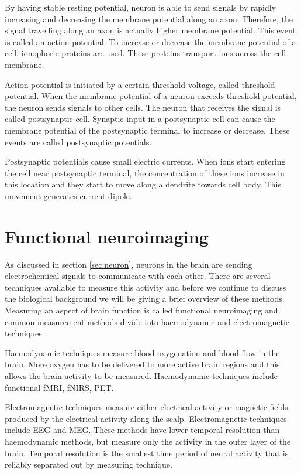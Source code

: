 By having stable resting potential, neuron is able to send signals by rapidly increasing and decreasing the membrane potential along an axon. Therefore, the signal travelling along an axon is actually higher membrane potential. This event is called an action potential. To increase or decrease the membrane potential of a cell, ionophoric proteins are used. These proteins transport ions across the cell membrane.

Action potential is initiated by a certain threshold voltage, called threshold potential. When the membrane potential of a neuron exceeds threshold potential, the neuron sends signals to other cells. The neuron that receives the signal is called postsynaptic cell. Synaptic input in a postsynaptic cell can cause the membrane potential of the postsynaptic terminal to increase or decrease. These events are called postsynaptic potentials.

Postsynaptic potentials cause small electric currents. When ions start entering the cell near postsynaptic terminal, the concentration of these ions increase in this location and they start to move along a dendrite towards cell body. This movement generates current dipole.

\section{Functional neuroimaging}
\label{sec:neuroimaging}

As discussed in section \ref{sec:neuron}, neurons in the brain are sending electrochemical signals to communicate with each other. There are several techniques available to measure this activity and before we continue to discuss the biological background we will be giving a brief overview of these methods. Measuring an aspect of brain function is called functional neuroimaging and common measurement methods divide into haemodynamic and electromagnetic techniques.

Haemodynamic techniques measure blood oxygenation and blood flow in the brain. More oxygen has to be delivered to more active brain regions and this allows the brain activity to be measured. Haemodynamic techniques include functional \acrfull{fMRI}, \acrfull{fNIRS}, \acrfull{PET}.

Electromagnetic techniques measure either electrical activity or magnetic fields produced by the electrical activity along the scalp. Electromagnetic techniques include \acrfull{EEG} and \acrfull{MEG}. These methods have lower temporal resolution than haemodynamic methods, but measure only the activity in the outer layer of the brain. Temporal resolution is the smallest time period of neural activity that is reliably separated out by measuring technique.

